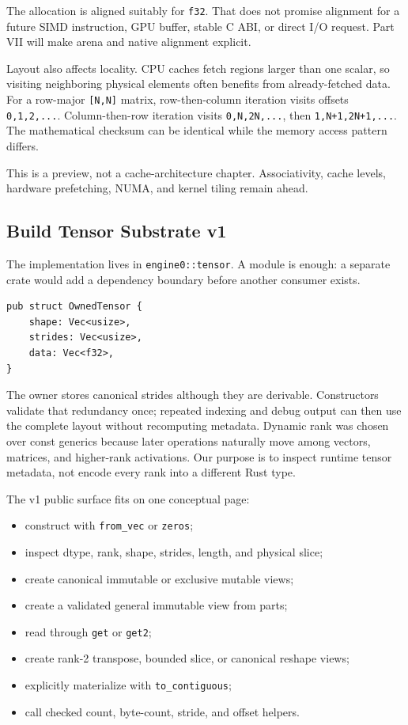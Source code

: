 \documentclass[
  10pt,
]{article}
\providecommand{\tightlist}{%
  \setlength{\itemsep}{0pt}\setlength{\parskip}{0pt}}
\begin{document}
The allocation is aligned suitably for \texttt{f32}. That does not
promise alignment for a future SIMD instruction, GPU buffer, stable C
ABI, or direct I/O request. Part VII will make arena and native
alignment explicit.

Layout also affects locality. CPU caches fetch regions larger than one
scalar, so visiting neighboring physical elements often benefits from
already-fetched data. For a row-major \texttt{{[}N,N{]}} matrix,
row-then-column iteration visits offsets \texttt{0,1,2,...}.
Column-then-row iteration visits \texttt{0,N,2N,...}, then
\texttt{1,N+1,2N+1,...}. The mathematical checksum can be identical
while the memory access pattern differs.

This is a preview, not a cache-architecture chapter. Associativity,
cache levels, hardware prefetching, NUMA, and kernel tiling remain
ahead.

\subsection{Build Tensor Substrate v1}\label{build-tensor-substrate-v1}

The implementation lives in \texttt{engine0::tensor}. A module is
enough: a separate crate would add a dependency boundary before another
consumer exists.

\begin{verbatim}
pub struct OwnedTensor {
    shape: Vec<usize>,
    strides: Vec<usize>,
    data: Vec<f32>,
}
\end{verbatim}

The owner stores canonical strides although they are derivable.
Constructors validate that redundancy once; repeated indexing and debug
output can then use the complete layout without recomputing metadata.
Dynamic rank was chosen over const generics because later operations
naturally move among vectors, matrices, and higher-rank activations. Our
purpose is to inspect runtime tensor metadata, not encode every rank
into a different Rust type.

The v1 public surface fits on one conceptual page:

\begin{itemize}
\tightlist
\item
  construct with \texttt{from\_vec} or \texttt{zeros};
\item
  inspect dtype, rank, shape, strides, length, and physical slice;
\item
  create canonical immutable or exclusive mutable views;
\item
  create a validated general immutable view from parts;
\item
  read through \texttt{get} or \texttt{get2};
\item
  create rank-2 transpose, bounded slice, or canonical reshape views;
\item
  explicitly materialize with \texttt{to\_contiguous};
\item
  call checked count, byte-count, stride, and offset helpers.
\end{itemize}
\end{document}
